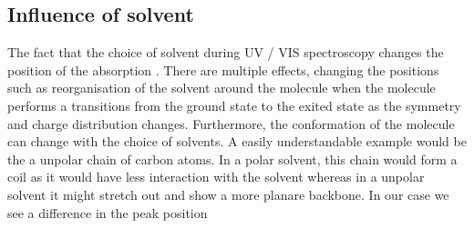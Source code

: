 \subsection{Influence of solvent}

The fact that the choice of solvent during UV / VIS spectroscopy changes the position of the absorption \cite{Parson.2015}. There are multiple effects, changing the positions such as reorganisation of 
the solvent around the molecule when the molecule performs a transitions from the ground state to the exited state as the symmetry and charge distribution changes. Furthermore, the conformation
of the molecule can change with the choice of solvents. A easily understandable example would be the a unpolar chain of carbon atoms. In a polar solvent, this chain would form a coil as it would have less interaction with 
the solvent whereas in a unpolar solvent it might stretch out and show a more planare backbone. 
In our case we see a difference in the peak position 